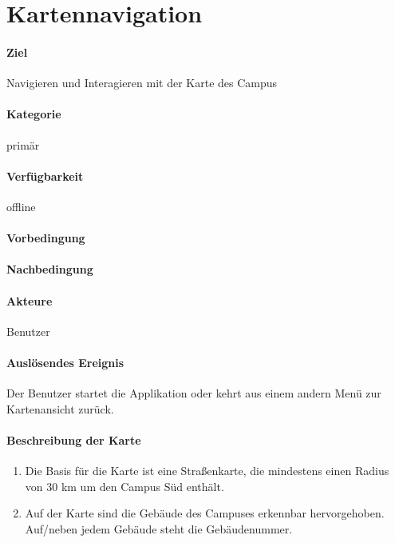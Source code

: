 \section{Kartennavigation}
\paragraph{Ziel}
Navigieren und Interagieren mit der Karte des Campus
\paragraph{Kategorie}
primär
\paragraph{Verfügbarkeit}
offline
\paragraph{Vorbedingung}

\paragraph{Nachbedingung}

\paragraph{Akteure}
Benutzer
\paragraph{Auslösendes Ereignis}
Der Benutzer startet die Applikation oder kehrt aus einem andern Menü zur Kartenansicht zurück.
\paragraph{Beschreibung der Karte}
\begin{enumerate}
    \item Die Basis für die Karte ist eine Straßenkarte, die mindestens einen Radius von 30 km um den Campus Süd enthält.
    \item Auf der Karte sind die Gebäude des Campuses erkennbar hervorgehoben. Auf/neben jedem Gebäude steht die Gebäudenummer.
\end{enumerate}
